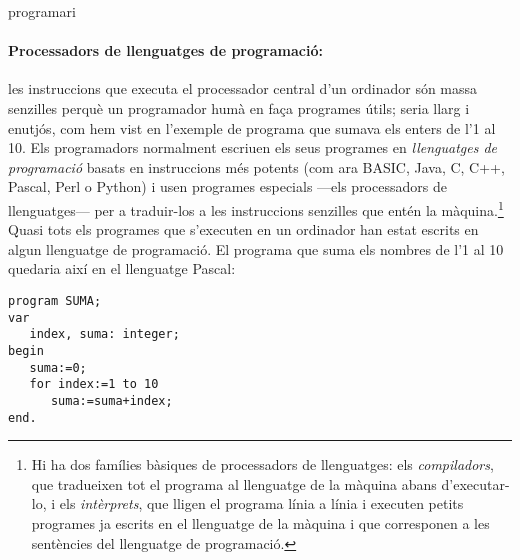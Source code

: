 \begin{persabermes}{programari}
  \paragraph{Processadors de llenguatges de programació:} les
  instruccions que executa el processador central d'un ordinador són
  massa senzilles perquè un programador humà en faça programes útils;
  seria llarg i enutjós, com hem vist en l'exemple de programa que
  sumava els enters de l'1 al 10.  Els programadors normalment escriuen
  els seus programes en {\em llenguatges de programació} basats en
  instruccions més potents (com ara BASIC, Java, C, C++, Pascal, Perl o
  Python) i usen programes especials ---els processadors de
  llenguatges--- per a traduir-los a les instruccions senzilles que
  entén la màquina.\footnote{Hi ha dos famílies bàsiques de processadors
    de llenguatges: els \emph{compiladors}, que tradueixen tot el
    programa al llenguatge de la màquina abans d'executar-lo, i els
    \emph{intèrprets}, que lligen el programa línia a línia i executen
    petits programes ja escrits en el llenguatge de la màquina i que
    corresponen a les sentències del llenguatge de programació.} Quasi
  tots els programes que s'executen en un ordinador han estat escrits en
  algun llenguatge de programació. El programa que suma els nombres de
  l'1 al 10 quedaria així en el llenguatge Pascal:
\begin{verbatim}
program SUMA;
var
   index, suma: integer;
begin
   suma:=0;
   for index:=1 to 10
      suma:=suma+index;
end.
\end{verbatim}



\end{persabermes}
